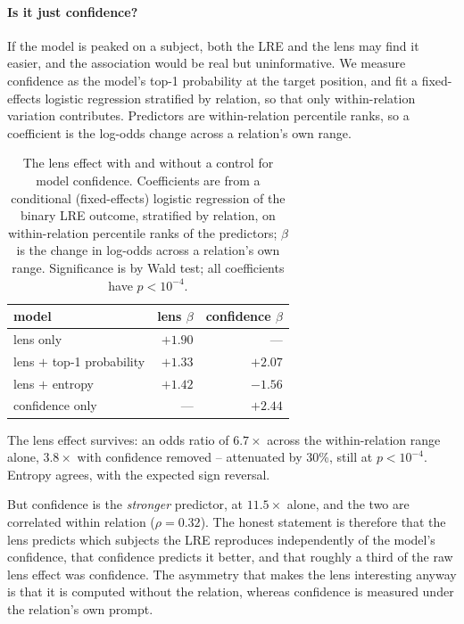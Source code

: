 \paragraph{Is it just confidence?}
\label{par:conf}
If the model is peaked on a subject, both the LRE and the lens may find it
easier, and the association would be real but uninformative. We measure
confidence as the model's top-1 probability at the target position, and
fit a fixed-effects logistic regression stratified by relation, so that
only within-relation variation contributes. Predictors are within-relation
percentile ranks, so a coefficient is the log-odds change across a
relation's own range.

\begin{table}[t]
\centering\small
\begin{tabular}{@{}lrr@{}}
\toprule
model & lens $\beta$ & confidence $\beta$ \\
\midrule
lens only & $+1.90$ & --- \\
lens $+$ top-1 probability & $+1.33$ & $+2.07$ \\
lens $+$ entropy & $+1.42$ & $-1.56$ \\
confidence only & --- & $+2.44$ \\
\bottomrule
\end{tabular}
\caption{The lens effect with and without a control for model confidence.
Coefficients are from a conditional (fixed-effects) logistic regression
of the binary LRE outcome, stratified by relation, on within-relation
percentile ranks of the predictors; $\beta$ is the change in log-odds
across a relation's own range. Significance is by Wald test; all
coefficients have $p < 10^{-4}$.}
\label{tab:conf}
\end{table}

The lens effect survives: an odds ratio of $6.7\times$ across the
within-relation range alone, $3.8\times$ with confidence removed
-- attenuated by 30\%, still at $p < 10^{-4}$. Entropy agrees, with the
expected sign reversal.

But confidence is the \emph{stronger} predictor, at $11.5\times$ alone,
and the two are correlated within relation ($\rho = 0.32$). The honest
statement is therefore that the lens predicts which subjects the LRE
reproduces independently of the model's confidence, that confidence
predicts it better, and that roughly a third of the raw lens effect was
confidence. The asymmetry that makes the lens interesting anyway is that
it is computed without the relation, whereas confidence is measured under
the relation's own prompt.


